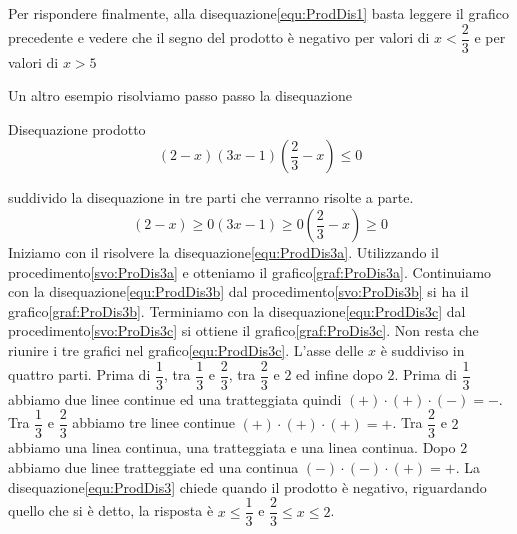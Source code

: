 Per rispondere finalmente, alla disequazione\nobs\vref{equ:ProdDis1} basta leggere il grafico precedente e vedere che il segno del prodotto è negativo per valori di $x<\dfrac{2}{3}$ e per valori di $x>5$

Un altro esempio risolviamo passo passo la disequazione
\begin{esempiot}{Disequazione prodotto}{}
\begin{equation}
(2-x)(3x-1)(\dfrac{2}{3}-x)\leq 0\label{equ:ProdDis3}
\end{equation}
\end{esempiot}
suddivido la disequazione in tre parti che verranno risolte a parte.
%
\begin{subequations}
	\begin{equation}
	(2-x)\geq 0\label{equ:ProdDis3a}
	\end{equation}
	\begin{equation}
	(3x-1)\geq 0\label{equ:ProdDis3b}
	\end{equation}
	\begin{equation}
	(\dfrac{2}{3}-x)\geq 0\label{equ:ProdDis3c}
	\end{equation}
\end{subequations}
Iniziamo con il risolvere  la disequazione\nobs\vref{equ:ProdDis3a}. Utilizzando  il procedimento\nobs\vref{svo:ProDis3a} e otteniamo il grafico\nobs\vref{graf:ProDis3a}. Continuiamo con la disequazione\nobs\vref{equ:ProdDis3b} dal  procedimento\nobs\vref{svo:ProDis3b} si ha il grafico\nobs\vref{graf:ProDis3b}. Terminiamo  con la disequazione\nobs\vref{equ:ProdDis3c} dal  procedimento\nobs\vref{svo:ProDis3c} si ottiene il grafico\nobs\vref{graf:ProDis3c}. Non resta che riunire i tre grafici nel grafico\nobs\vref{equ:ProdDis3c}. L'asse delle $x$ è suddiviso in quattro parti. Prima di $\dfrac{1}{3}$, tra $\dfrac{1}{3}$ e $\dfrac{2}{3}$, tra $\dfrac{2}{3}$ e $2$ ed infine dopo $2$. Prima di $\dfrac{1}{3}$ abbiamo due linee continue ed una tratteggiata quindi $(+)\cdot(+)\cdot(-)=-$. Tra $\dfrac{1}{3}$ e $\dfrac{2}{3}$ abbiamo tre linee continue $(+)\cdot(+)\cdot(+)=+$. Tra $\dfrac{2}{3}$ e $2$ abbiamo una linea continua, una tratteggiata e una linea continua. Dopo $2$ abbiamo due linee tratteggiate ed una continua $(-)\cdot(-)\cdot(+)=+$.  La disequazione\nobs\vref{equ:ProdDis3} chiede quando il prodotto è negativo, riguardando quello che si è detto, la risposta è $x\leq \dfrac{1}{3}$ e $\dfrac{2}{3}\leq x \leq 2$.
